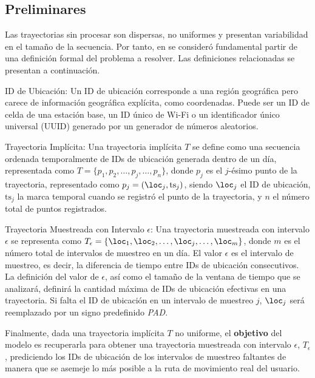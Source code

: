 \subsection{Preliminares}

Las trayectorias sin procesar son dispersas, no uniformes y presentan variabilidad en el tamaño de la secuencia. Por tanto, en \cite{si2023trajbert} se consideró fundamental partir de una definición formal del problema a resolver. Las definiciones relacionadas se presentan a continuación.

\begin{definition}{ID de Ubicación:}
    Un ID de ubicación corresponde a una región geográfica pero carece de información geográfica explícita, como coordenadas. Puede ser un ID de celda de una estación base, un ID único de Wi-Fi o un identificador único universal (UUID) generado por un generador de números aleatorios.
\end{definition}

\begin{definition}{Trayectoria Implícita:}
    Una trayectoria implícita $T$ se define como una secuencia ordenada temporalmente de IDs de ubicación generada dentro de un día, representada como $T = \{p_1, p_2, \ldots, p_j, \ldots, p_n\}$, donde $p_j$ es el $j$-ésimo punto de la trayectoria, representado como $p_j = (\loc_j, \text{ts}_j)$, siendo $\loc_j$ el ID de ubicación, $\text{ts}_j$ la marca temporal cuando se registró el punto de la trayectoria, y $n$ el número total de puntos registrados.
\end{definition}

\begin{definition}{Trayectoria Muestreada con Intervalo $\epsilon$:}
    Una trayectoria muestreada con intervalo $\epsilon$ se representa como $T_\epsilon = \{\loc_1, \loc_2, \ldots, \loc_j, \ldots, \loc_m\}$, donde $m$ es el número total de intervalos de muestreo en un día. El valor $\epsilon$ es el intervalo de muestreo, es decir, la diferencia de tiempo entre IDs de ubicación consecutivos. La definición del valor de $\epsilon$, así como el tamaño de la ventana de tiempo que se analizará, definirá la cantidad máxima de IDs de ubicación efectivas en una trayectoria. Si falta el ID de ubicación en un intervalo de muestreo $j$, $\loc_j$ será reemplazado por un signo predefinido \emph{PAD}.
    \label{def:e_sampling}
\end{definition}

Finalmente, dada una trayectoria implícita $T$ no uniforme, el \textbf{objetivo} del modelo es recuperarla para obtener una trayectoria muestreada con intervalo $\epsilon$, $T_\epsilon$, prediciendo los IDs de ubicación de los intervalos de muestreo faltantes de manera que se asemeje lo más posible a la ruta de movimiento real del usuario.

